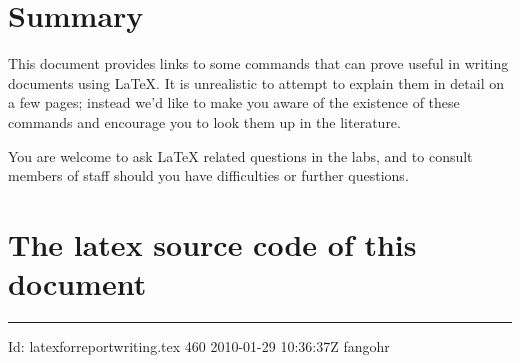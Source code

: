 \documentclass[12pt,a4paper]{article}
\begin{document}
\section{Summary}

This document provides links to some commands that can prove useful in
writing documents using \LaTeX. It is unrealistic to attempt to
explain them in detail on a few pages; instead we'd like to make you
aware of the existence of these commands and encourage you to look
them up in the literature.

You are welcome to ask \LaTeX{} related questions in the labs, and to
consult members of staff should you have difficulties or further
questions.



\appendix

\section{The latex source code of this document}



\vfill\hrule \tiny 
$ $Id: latexforreportwriting.tex 460 2010-01-29 10:36:37Z fangohr $ $
\end{document}
